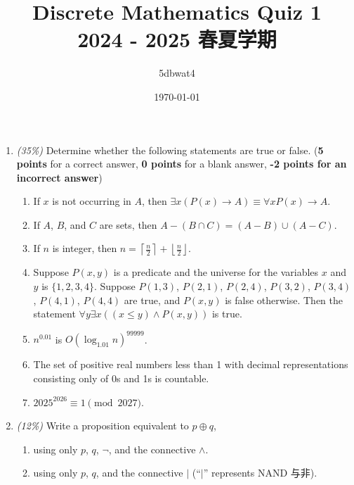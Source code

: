 \documentclass{article}
\title{Discrete Mathematics Quiz 1\\\small{2024 - 2025 春夏学期}}
\author{5dbwat4}
\date{\today}
\begin{document}
\maketitle


\begin{enumerate}
\def\labelenumi{\arabic{enumi}.}
\item
  \emph{(35\%)} Determine whether the following statements are true or
  false. (\textbf{5 points} for a correct answer, \textbf{0 points} for
  a blank answer, \textbf{-2 points for an incorrect answer})

\begin{enumerate}
\def\labelenumi{\alph{enumi})}
\item
  If \(x\) is not occurring in \(A\), then
  \(\exists x(P(x)\to A)\equiv \forall x P(x) \to A\).
\item
  If \(A\), \(B\), and \(C\) are sets, then
  \(A-(B\cap C)=(A - B)\cup(A - C)\).
\item
  If \(n\) is integer, then
  \(n=\left\lceil\frac{n}{2}\right\rceil+\left\lfloor\frac{n}{2}\right\rfloor\).
\item
  Suppose \(P(x,y)\) is a predicate and the universe for the variables
  \(x\) and \(y\) is \(\{1,2,3,4\}\). Suppose \(P(1,3)\), \(P(2,1)\), \(P(2,4)\),
  \(P(3,2)\), \(P(3,4)\), \(P(4,1)\), \(P(4,4)\) are true, and
  \(P(x,y)\) is false otherwise. Then the statement
  \(\forall y\exists x((x\leq y)\land P(x,y))\) is true.
\item
  \(n^{0.01}\) is \(O(\log_{1.01}{n})^{99999}\).
\item
  The set of positive real numbers less than 1 with decimal
  representations consisting only of 0s and 1s is countable.
\item
  \(2025^{2026}\equiv1\pmod{2027}\).
\end{enumerate}

\item
  \emph{(12\%)} Write a proposition equivalent to \(p\oplus q\),

\begin{enumerate}
\def\labelenumi{\alph{enumi})}
\item
  using only \(p\), \(q\), \(\neg\), and the connective \(\land\).
\item
  using only \(p\), \(q\), and the connective \(|\) (``\(|\)''
  represents NAND 与非).
\end{enumerate}


\end{enumerate}
\end{document}
